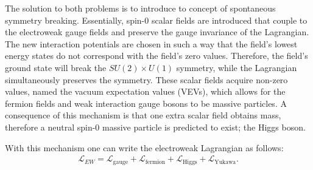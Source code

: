 The solution to both problems is to introduce to concept of spontaneous symmetry breaking. 
Essentially, spin-0 scalar fields are introduced that couple to the electroweak gauge fields and preserve the gauge invariance of the Lagrangian.
The new interaction potentials are chosen in such a way that the field's lowest energy states do not correspond with the field's zero values.
Therefore, the field's ground state will break the $SU(2) \times U(1)$ symmetry, while the Lagrangian simultaneously preserves the symmetry.
These scalar fields acquire non-zero values, named the vacuum expectation values (VEVs), which allows for the fermion fields and weak interaction gauge bosons to be massive particles.
A consequence of this mechanism is that one extra scalar field obtains mass, therefore a neutral spin-0 massive particle is predicted to exist; the Higgs boson.

With this mechanism one can write the electroweak Lagrangian as follows:
\begin{align}
\mathcal{L}_{EW} = \mathcal{L}_{\textrm{gauge}} + \mathcal{L}_{\textrm{fermion}} + \mathcal{L}_{\textrm{Higgs}} + \mathcal{L}_{\textrm{Yukawa}}.
\end{align}

